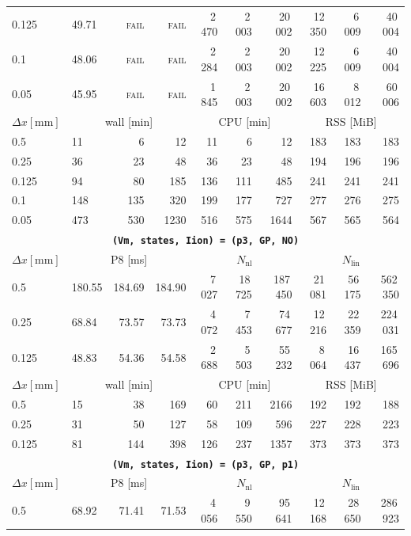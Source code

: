 \documentclass[11pt,a4paper]{article}
\newcommand{\code}[1]{\texttt{\small #1}}
\begin{document}
\begin{center}
\begin{longtable}{l|lrr|rrr|rrr}
0.125 & 49.71 & \textsc{fail} & \textsc{fail} & 2\,470 & 2\,003 & 20\,002 & 12\,350 & 6\,009 & 40\,004\\
0.1 & 48.06 & \textsc{fail} & \textsc{fail} & 2\,284 & 2\,003 & 20\,002 & 12\,225 & 6\,009 & 40\,004\\
0.05 & 45.95 & \textsc{fail} & \textsc{fail} & 1\,845 & 2\,003 & 20\,002 & 16\,603 & 8\,012 & 60\,006\\
\hline
$ \Delta x [\text{mm}] $ & \multicolumn{3}{c|}{wall [min]} & \multicolumn{3}{c|}{CPU [min]} & \multicolumn{3}{c|}{RSS [MiB]}\\
0.5 & 11 & 6 & 12 & 11 & 6 & 12 & 183 & 183 & 183\\
0.25 & 36 & 23 & 48 & 36 & 23 & 48 & 194 & 196 & 196\\
0.125 & 94 & 80 & 185 & 136 & 111 & 485 & 241 & 241 & 241\\
0.1 & 148 & 135 & 320 & 199 & 177 & 727 & 277 & 276 & 275\\
0.05 & 473 & 530 & 1230 & 516 & 575 & 1644 & 567 & 565 & 564\\
\hline
\hline
\multicolumn{10}{c}{\textbf{\code{(Vm, states, Iion) = (p3, GP, NO)}}}\\\hline
$ \Delta x [\text{mm}] $ & \multicolumn{3}{c|}{P8 [ms]} & \multicolumn{3}{c|}{$N_{\mathrm{nl}}$} & \multicolumn{3}{c|}{$N_{\mathrm{lin}}$}\\
0.5 & 180.55 & 184.69 & 184.90 & 7\,027 & 18\,725 & 187\,450 & 21\,081 & 56\,175 & 562\,350\\
0.25 & 68.84 & 73.57 & 73.73 & 4\,072 & 7\,453 & 74\,677 & 12\,216 & 22\,359 & 224\,031\\
0.125 & 48.83 & 54.36 & 54.58 & 2\,688 & 5\,503 & 55\,232 & 8\,064 & 16\,437 & 165\,696\\
\hline
$ \Delta x [\text{mm}] $ & \multicolumn{3}{c|}{wall [min]} & \multicolumn{3}{c|}{CPU [min]} & \multicolumn{3}{c|}{RSS [MiB]}\\
0.5 & 15 & 38 & 169 & 60 & 211 & 2166 & 192 & 192 & 188\\
0.25 & 31 & 50 & 127 & 58 & 109 & 596 & 227 & 228 & 223\\
0.125 & 81 & 144 & 398 & 126 & 237 & 1357 & 373 & 373 & 373\\
\hline
\hline
\multicolumn{10}{c}{\textbf{\code{(Vm, states, Iion) = (p3, GP, p1)}}}\\\hline
$ \Delta x [\text{mm}] $ & \multicolumn{3}{c|}{P8 [ms]} & \multicolumn{3}{c|}{$N_{\mathrm{nl}}$} & \multicolumn{3}{c|}{$N_{\mathrm{lin}}$}\\
0.5 & 68.92 & 71.41 & 71.53 & 4\,056 & 9\,550 & 95\,641 & 12\,168 & 28\,650 & 286\,923\\

\end{longtable}
\end{center}
\end{document}
